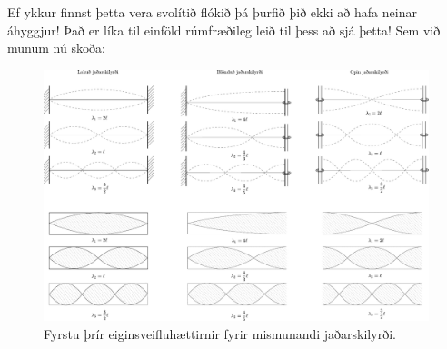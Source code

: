 \ifdefined \wholebook \else\documentclass[oneside]{book}\usepackage{EdlBook}\graphicspath{{figures/}}
\begin{document}
Ef ykkur finnst þetta vera svolítið flókið þá þurfið þið ekki að hafa neinar áhyggjur! Það er líka til einföld rúmfræðileg leið til þess að sjá þetta! Sem við munum nú skoða:

\begin{figure}[H]
    \centering
    \includegraphics[width = \textwidth]{figures/neumann-stadbylgjurs.pdf}
    \caption{Fyrstu þrír eiginsveifluhættirnir fyrir mismunandi jaðarskilyrði.}
    \label{fig:eiginsveiflur}
\end{figure}
\end{document}
